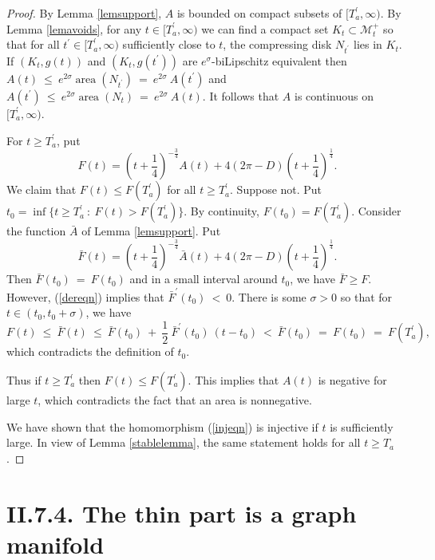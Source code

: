 \documentclass[12pt]{amsart}
\newcommand{\area}{\operatorname{area}}
\newcommand{\M}{{\mathcal M}}
\numberwithin{equation}{section}
\theoremstyle{plain}
\theoremstyle{definition}
\theoremstyle{remark}
\begin{document}
\begin{proof}
By Lemma \ref{lemsupport}, $A$ is bounded on compact subsets of 
$[T^\prime_a, \infty)$.
By Lemma \ref{lemavoids}, for any
$t \in [T^\prime_a, \infty)$ we can find a compact set $K_t \subset \M_t^+$
so that for all $t^\prime \in [T^\prime_a, \infty)$ sufficiently close to $t$, 
the compressing disk $N_{t^\prime}$ lies in $K_t$. If
$(K_t, g(t))$ and $(K_t, g(t^\prime))$ are $e^\sigma$-biLipschitz
equivalent then $A(t) \: \le \: e^{2\sigma} \area \left( N_{t^\prime} \right)
\: = \: e^{2 \sigma} \: A(t^\prime)$ and 
$A(t^\prime) \: \le \: e^{2\sigma} \area \left( N_{t} \right)
\: = \: e^{2 \sigma} \: A(t)$. It follows that $A$ is continuous
on $[T^\prime_a, \infty)$.


For $t \ge T_a^\prime$, put
\begin{equation}
F(t) = 
\left(t+\frac14\right)^{-\frac34} A(t) + 4 (2\pi-D) \left(t+\frac14\right)^{\frac14}.
\end{equation}
We claim that 
$F(t) \le F(T_a^\prime)$ for all $t \ge T_a^\prime$. Suppose not.  Put
$t_0 = \inf \{t \ge T_a^\prime \: : \: F(t) > F(T_a^\prime) \}$.
By continuity, $F(t_0) = F(T_a^\prime)$.
Consider the function $\bar A$ of Lemma \ref{lemsupport}.
Put
\begin{equation}
\bar F(t) =  \left(t+\frac14\right)^{-\frac34} \bar A(t) + 4 (2\pi-D) \left(t+\frac14\right)^{\frac14}.
\end{equation}
Then $\bar F(t_0) \: = \: F(t_0)$ and
in a small interval around $t_0$, we have
$\bar F \ge F$. However, (\ref{dereqn}) implies that
$\bar F^\prime(t_0)
\: < \: 0$.
There is some $\sigma > 0$ so that
for $t \in (t_0, t_0 + \sigma)$, we have
\begin{equation}
F(t) \: \le \: \bar F (t) \: \le \: \bar F(t_0) \: + \: \frac12 \: 
\bar F^\prime(t_0) \: (t - t_0) \: 
< \: \bar F(t_0) \: = \: F(t_0) \: = \: F(T_a^\prime),
\end{equation}
which contradicts the definition of $t_0$.

Thus if $t \ge T_a^\prime$ then
$F(t) \le F(T_a^\prime)$. This implies that
$A(t)$ is negative for large $t$, which contradicts the fact
that an area is nonnegative.


We have shown that the homomorphism (\ref{injeqn}) is injective if $t$ is sufficiently large.
In view of Lemma \ref{stablelemma}, the same statement holds for all $t \ge T_a$.
\end{proof}

\section{II.7.4. The thin part is a graph manifold} \label{II.7.4}
\end{document}
